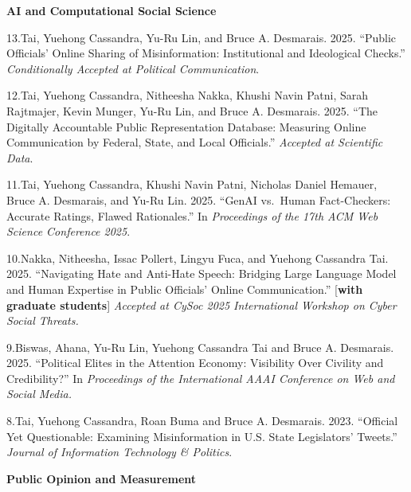\documentclass[10.5pt,]{article}
\providecommand{\tightlist}{%
	\setlength{\itemsep}{0pt}\setlength{\parskip}{0pt}}
\renewenvironment{itemize}{
	\begin{list}{}{
			\setlength{\leftmargin}{1.5em}
		}
	}{
	\end{list}
}
\begin{document}
\begin{itemize}
\tightlist
\item
  \textbf{AI and Computational Social Science}

  \begin{itemize}
  \tightlist
  \item
    13.Tai, Yuehong Cassandra, Yu-Ru Lin, and Bruce A. Desmarais. 2025.
    ``Public Oﬀicials' Online Sharing of Misinformation: Institutional
    and Ideological Checks.'' \emph{Conditionally Accepted at Political
    Communication}.
  \item
    12.Tai, Yuehong Cassandra, Nitheesha Nakka, Khushi Navin Patni,
    Sarah Rajtmajer, Kevin Munger, Yu-Ru Lin, and Bruce A. Desmarais.
    2025. ``The Digitally Accountable Public Representation Database:
    Measuring Online Communication by Federal, State, and Local
    Oﬀicials.'' \emph{Accepted at Scientific Data}.
  \item
    11.Tai, Yuehong Cassandra, Khushi Navin Patni, Nicholas Daniel
    Hemauer, Bruce A. Desmarais, and Yu-Ru Lin. 2025. ``GenAI vs.~Human
    Fact-Checkers: Accurate Ratings, Flawed Rationales.'' In
    \emph{Proceedings of the 17th ACM Web Science Conference 2025}.
  \item
    10.Nakka, Nitheesha, Issac Pollert, Lingyu Fuca, and Yuehong
    Cassandra Tai. 2025. ``Navigating Hate and Anti-Hate Speech:
    Bridging Large Language Model and Human Expertise in Public
    Oﬀicials' Online Communication.'' {[}\textbf{with graduate
    students}{]} \emph{Accepted at CySoc 2025 International Workshop on
    Cyber Social Threats.}
  \item
    9.Biswas, Ahana, Yu-Ru Lin, Yuehong Cassandra Tai and Bruce A.
    Desmarais. 2025. ``Political Elites in the Attention Economy:
    Visibility Over Civility and Credibility?'' In \emph{Proceedings of
    the International AAAI Conference on Web and Social Media.}
  \item
    8.Tai, Yuehong Cassandra, Roan Buma and Bruce A. Desmarais. 2023.
    ``Oﬀicial Yet Questionable: Examining Misinformation in U.S. State
    Legislators' Tweets.'' \emph{Journal of Information Technology \&
    Politics}.
  \end{itemize}
\item
  \textbf{Public Opinion and Measurement}


\end{itemize}
\end{document}
